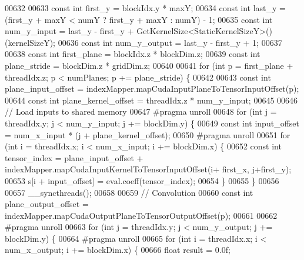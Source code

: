 \begin{DoxyCode}
00632 
00633   \textcolor{keyword}{const} \textcolor{keywordtype}{int} first\_y = blockIdx.y * maxY;
00634   \textcolor{keyword}{const} \textcolor{keywordtype}{int} last\_y = (first\_y + maxY < numY ? first\_y + maxY : numY) - 1;
00635   \textcolor{keyword}{const} \textcolor{keywordtype}{int} num\_y\_input = last\_y - first\_y + GetKernelSize<StaticKernelSizeY>()(kernelSizeY);
00636   \textcolor{keyword}{const} \textcolor{keywordtype}{int} num\_y\_output = last\_y - first\_y + 1;
00637 
00638   \textcolor{keyword}{const} \textcolor{keywordtype}{int} first\_plane = blockIdx.z * blockDim.z;
00639   \textcolor{keyword}{const} \textcolor{keywordtype}{int} plane\_stride = blockDim.z * gridDim.z;
00640 
00641   \textcolor{keywordflow}{for} (\textcolor{keywordtype}{int} p = first\_plane + threadIdx.z; p < numPlanes; p += plane\_stride) \{
00642 
00643     \textcolor{keyword}{const} \textcolor{keywordtype}{int} plane\_input\_offset = indexMapper.mapCudaInputPlaneToTensorInputOffset(p);
00644     \textcolor{keyword}{const} \textcolor{keywordtype}{int} plane\_kernel\_offset = threadIdx.z * num\_y\_input;
00645 
00646     \textcolor{comment}{// Load inputs to shared memory}
00647 \textcolor{preprocessor}{    #pragma unroll}
00648     \textcolor{keywordflow}{for} (\textcolor{keywordtype}{int} j = threadIdx.y; j < num\_y\_input; j += blockDim.y) \{
00649       \textcolor{keyword}{const} \textcolor{keywordtype}{int} input\_offset = num\_x\_input * (j + plane\_kernel\_offset);
00650 \textcolor{preprocessor}{      #pragma unroll}
00651       \textcolor{keywordflow}{for} (\textcolor{keywordtype}{int} i = threadIdx.x; i < num\_x\_input; i += blockDim.x) \{
00652         \textcolor{keyword}{const} \textcolor{keywordtype}{int} tensor\_index = plane\_input\_offset + indexMapper.mapCudaInputKernelToTensorInputOffset(i+
      first\_x, j+first\_y);
00653         s[i + input\_offset] = eval.coeff(tensor\_index);
00654       \}
00655     \}
00656 
00657     \_\_syncthreads();
00658 
00659     \textcolor{comment}{// Convolution}
00660     \textcolor{keyword}{const} \textcolor{keywordtype}{int} plane\_output\_offset = indexMapper.mapCudaOutputPlaneToTensorOutputOffset(p);
00661 
00662 \textcolor{preprocessor}{    #pragma unroll}
00663     \textcolor{keywordflow}{for} (\textcolor{keywordtype}{int} j = threadIdx.y; j < num\_y\_output; j += blockDim.y) \{
00664 \textcolor{preprocessor}{      #pragma unroll}
00665       \textcolor{keywordflow}{for} (\textcolor{keywordtype}{int} i = threadIdx.x; i < num\_x\_output; i += blockDim.x) \{
00666         \textcolor{keywordtype}{float} result = 0.0f;

\end{DoxyCode}
